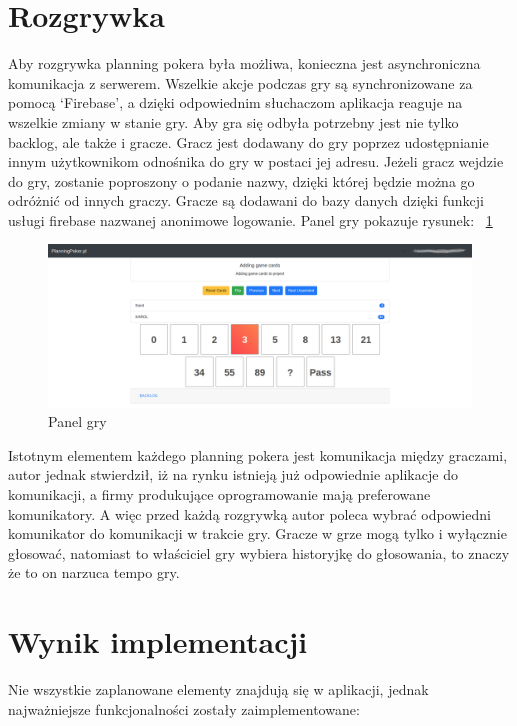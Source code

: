 \section{Rozgrywka}

Aby rozgrywka planning pokera była możliwa,
konieczna jest asynchroniczna komunikacja z serwerem.
Wszelkie akcje podczas gry są synchronizowane za pomocą `Firebase',
a dzięki odpowiednim słuchaczom aplikacja reaguje na wszelkie zmiany w stanie gry.
Aby gra się odbyła potrzebny jest nie tylko backlog, ale także i gracze.
Gracz jest dodawany do gry poprzez udostępnianie innym użytkownikom odnośnika do gry w postaci jej adresu.
Jeżeli gracz wejdzie do gry, zostanie poproszony o podanie nazwy,
dzięki której będzie można go odróżnić od innych graczy.
Gracze są dodawani do bazy danych dzięki funkcji usługi firebase nazwanej anonimowe logowanie.
Panel gry pokazuje rysunek:
~\ref{rys:gra}
\begin{figure}[H]
	\centering\includegraphics[width=.9\textwidth]{img/gra}
	\caption{Panel gry}\label{rys:gra}%
\end{figure}

Istotnym elementem każdego planning pokera jest komunikacja między graczami,
autor jednak stwierdził,
iż na rynku istnieją już odpowiednie aplikacje do komunikacji,
a firmy produkujące oprogramowanie mają preferowane komunikatory.
A więc przed każdą rozgrywką autor poleca wybrać odpowiedni komunikator do komunikacji w trakcie gry.
Gracze w grze mogą tylko i wyłącznie głosować,
natomiast to właściciel gry wybiera historyjkę do głosowania, to znaczy że to on narzuca tempo gry.

\section{Wynik implementacji}

Nie wszystkie zaplanowane elementy znajdują się w aplikacji,
 jednak najważniejsze funkcjonalności zostały zaimplementowane:

